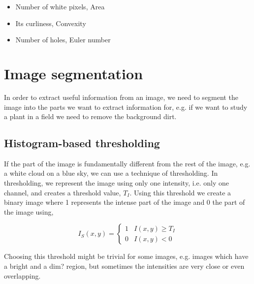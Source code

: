 \begin{itemize}
\item Number of white pixels, Area
\item Its curliness, Convexity
\item Number of holes, Euler number
\end{itemize}



\section{Image segmentation}

In order to extract useful information from an image, we need to segment the image into the parts we want to extract information for, e.g. if we want to study a plant in a field we need to remove the background dirt.

\subsection{Histogram-based thresholding}

If the part of the image is fundamentally different from the rest of the image, e.g. a white cloud on a blue sky, we can use a technique of thresholding. In thresholding, we represent the image using only one intensity, i.e. only one channel, and creates a threshold value, $T_I$. Using this threshold we create a binary image where 1 represents the intense part of the image and 0 the  part of the image using,

\begin{equation}
I_S(x,y)=\left \{ \begin{array}{ll}
1 & I(x,y) \geq T_I \\
0 & I(x,y) < 0
\end{array} \right.
\end{equation}


Choosing this threshold might be trivial for some images, e.g. images which have a bright and a dim? region, but sometimes the intensities are very close or even overlapping.

